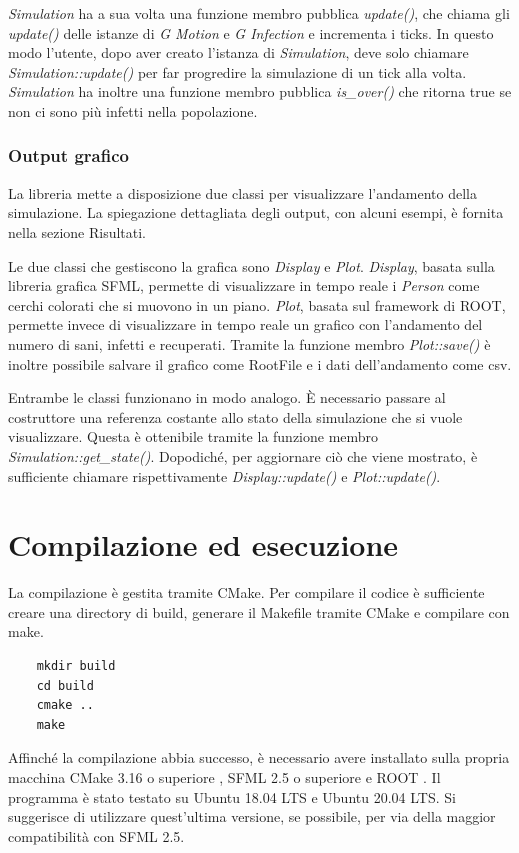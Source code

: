 \documentclass[a4paper,10pt,twocolumn]{article}
\begin{document}
\emph{Simulation} ha a sua volta una funzione membro pubblica \emph{update()}, che chiama gli \emph{update()} delle istanze di \emph{G Motion} e \emph{G Infection} e incrementa i ticks. In questo modo l’utente, dopo aver creato l’istanza di \emph{Simulation}, deve solo chiamare \emph{Simulation::update()} per far progredire la simulazione di un tick alla volta.
\emph{Simulation} ha inoltre una funzione membro pubblica \emph{is\_over()} che ritorna true se non ci sono più infetti nella popolazione.

\subsubsection*{Output grafico}
La libreria mette a disposizione due classi per visualizzare l’andamento della simulazione. La spiegazione dettagliata degli output, con alcuni esempi, è fornita nella sezione Risultati.

Le due classi che gestiscono la grafica sono \emph{Display} e \emph{Plot}. \emph{Display}, basata sulla libreria grafica SFML, permette di visualizzare in tempo reale i \emph{Person} come cerchi colorati che si muovono in un piano. \emph{Plot}, basata sul framework di ROOT, permette invece di visualizzare in tempo reale un grafico con l’andamento del numero di sani, infetti e recuperati. Tramite la funzione membro \emph{Plot::save()} è inoltre possibile salvare il grafico come RootFile e i dati dell’andamento come csv.

Entrambe le classi funzionano in modo analogo. È necessario passare al costruttore una referenza costante allo stato della simulazione che si vuole visualizzare. Questa è ottenibile tramite la funzione membro \emph{Simulation::get\_state()}. Dopodiché, per aggiornare ciò che viene mostrato, è sufficiente chiamare rispettivamente \emph{Display::update()} e \emph{Plot::update()}.


\section{Compilazione ed esecuzione}
La compilazione è gestita tramite CMake. Per compilare il codice è sufficiente creare una directory di build, generare il Makefile tramite CMake e compilare con make.

\begin{verbatim}
    mkdir build
    cd build
    cmake ..
    make
\end{verbatim}

Affinché la compilazione abbia successo, è necessario avere installato sulla propria macchina CMake 3.16 o superiore \cite{bib:CMake}, SFML 2.5 o superiore \cite{bib:SFML} e ROOT \cite{bib:ROOT}. Il programma è stato testato su Ubuntu 18.04 LTS e Ubuntu 20.04 LTS. Si suggerisce di utilizzare quest'ultima versione, se possibile, per via della maggior compatibilità con SFML 2.5.
\end{document}

